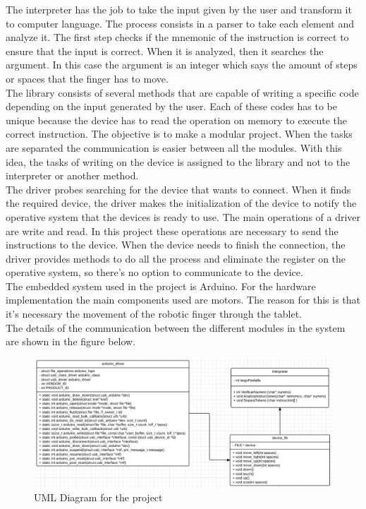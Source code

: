 \documentclass[12pt,twoside]{article}
\begin{document}
The interpreter has the job to take the input given by the user and transform it to computer language. The process consists in a parser to take each element and analyze it. The first step checks if the mnemonic of the instruction is correct to ensure that the input is correct. When it is analyzed, then it searches the argument. In this case the argument is an integer which says the amount of steps or spaces that the finger has to move. \\

The library consists of several methods that are capable of writing a specific code depending on the input generated by the user. Each of these codes has to be unique because the device has to read the operation on memory to execute the correct instruction. The objective is to make a modular project. When the tasks are separated the communication is easier between all the modules. With this idea, the tasks of writing on the device is assigned to the library and not to the interpreter or another method. \\

The driver probes searching for the device that wants to connect. When it finds the required device, the driver makes the initialization of the device to notify the operative system that the devices is ready to use. The main operations of a driver are write and read. In this project these operations are necessary to send the instructions to the device. When the device needs to finish the connection, the driver provides methods to do all the process and eliminate the register on the operative system, so there's no option to communicate to the device. \\

The embedded system used in the project is Arduino. For the hardware implementation the main components used are motors. The reason for this is that it's necessary the movement of the robotic finger through the tablet. \\


The details of the communication between the different modules in the system are shown in the figure below.

\begin{figure}[tb]
\centering 
\includegraphics[width = 1\hsize]{./figures/UML.png}
\caption{UML Diagram for the project} %
\label{fig:umlfigure}
\end{figure}
\end{document}
